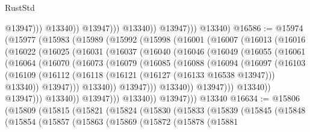 \begin{lexlean}{RustStd}
\begin{coremodule}
                                @13947)))
                          @13340))
                      @13947)))
                @13340))
            @13947)))
      @13340)
@16586 := @15974
    (@15977
      (@15983
        (@15989
          (@15992
            (@15998
              (@16001
                (@16007
                  (@16013
                    (@16016
                      (@16022
                        (@16025
                          (@16031
                            (@16037
                              (@16040
                                (@16046
                                  (@16049
                                    (@16055
                                      (@16061
                                        (@16064
                                          (@16070
                                            (@16073
                                              (@16079
                                                (@16085
                                                  (@16088
                                                    (@16094
                                                      (@16097
                                                        (@16103
                                                          (@16109
                                                            (@16112
                                                              (@16118
                                                                (@16121
                                                                  (@16127 (@16133 @16538 @13947)))
                                                                @13340))
                                                            @13947)))
                                                      @13340))
                                                  @13947)))
                                            @13340))
                                        @13947)))
                                  @13340))
                              @13947)))
                        @13340))
                    @13947)))
              @13340))
          @13947)))
    @13340
@16634 := @15806
    (@15809
      (@15815
        (@15821
          (@15824
            (@15830
              (@15833
                (@15839
                  (@15845
                    (@15848
                      (@15854
                        (@15857
                          (@15863
                            (@15869
                              (@15872
                                (@15878
                                  (@15881

\end{coremodule}
\end{lexlean}
